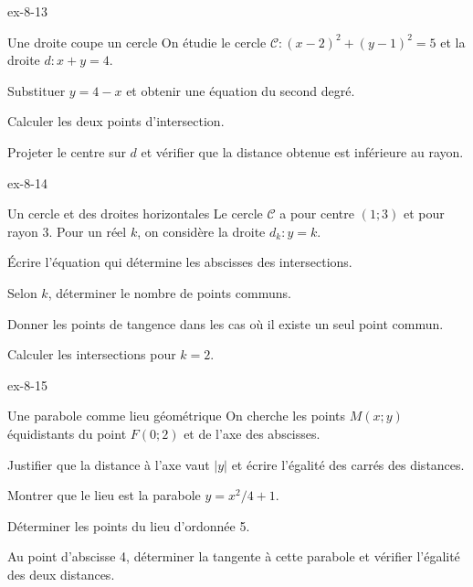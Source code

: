 \begin{blocLivre}{ex-8-13}
\begin{exercice}[3]{Une droite coupe un cercle}
On étudie le cercle $\mathcal C:(x-2)^2+(y-1)^2=5$ et la droite $d:x+y=4$.\begin{questions}
\item Substituer $y=4-x$ et obtenir une équation du second degré.
\item Calculer les deux points d’intersection.
\item Projeter le centre sur $d$ et vérifier que la distance obtenue est inférieure au rayon.
\end{questions}

\label{figgeo-08-13-ex}
\end{exercice}
\end{blocLivre}
\begin{blocLivre}{ex-8-14}
\begin{exercice}[3]{Un cercle et des droites horizontales}
Le cercle $\mathcal C$ a pour centre $(1;3)$ et pour rayon 3. Pour un réel $k$, on considère la droite $d_k:y=k$.\begin{questions}
\item Écrire l’équation qui détermine les abscisses des intersections.
\item Selon $k$, déterminer le nombre de points communs.
\item Donner les points de tangence dans les cas où il existe un seul point commun.
\item Calculer les intersections pour $k=2$.
\end{questions}

\label{figgeo-08-14-ex}
\end{exercice}
\end{blocLivre}
\begin{blocLivre}{ex-8-15}
\begin{exercice}[3]{Une parabole comme lieu géométrique}
On cherche les points $M(x;y)$ équidistants du point $F(0;2)$ et de l’axe des abscisses.\begin{questions}
\item Justifier que la distance à l’axe vaut $|y|$ et écrire l’égalité des carrés des distances.
\item Montrer que le lieu est la parabole $y=x^2/4+1$.
\item Déterminer les points du lieu d’ordonnée 5.
\item Au point d’abscisse 4, déterminer la tangente à cette parabole et vérifier l’égalité des deux distances.
\end{questions}

\label{figgeo-08-15-ex}
\end{exercice}
\end{blocLivre}
